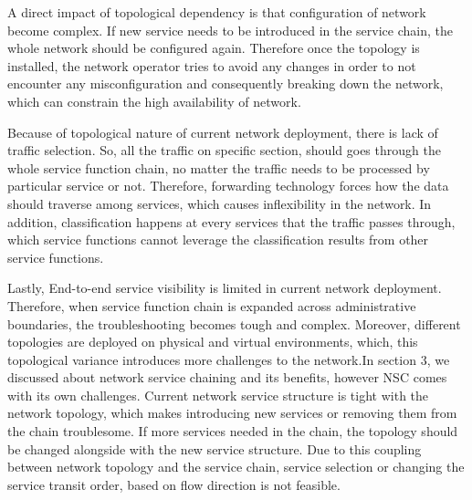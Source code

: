 A direct impact of topological dependency is that configuration of network become complex. If new service needs to be introduced in the service chain, the whole network should be configured again. Therefore once the topology is installed, the network operator tries to avoid any changes in order to not encounter any misconfiguration and consequently breaking down the network, which can constrain the high availability of network.

Because of topological nature of current network deployment, there is lack of traffic selection. So, all the traffic on specific section, should goes through the whole service function chain, no matter the traffic needs to be processed by particular service or not. Therefore, forwarding technology forces how the data should  traverse among services, which causes inflexibility in the network. In addition, classification happens at every services that the traffic passes through, which service functions cannot leverage the classification results from other service functions. 

Lastly, End-to-end service visibility is limited in current network deployment. Therefore, when service function chain is expanded across administrative boundaries, the troubleshooting becomes tough and complex. Moreover, different topologies are deployed on physical and virtual environments, which, this topological variance introduces more challenges to the network.In section 3, we discussed about network service chaining and its benefits, however NSC comes with its own challenges. Current network service structure is tight with the network topology, which makes introducing new services or removing them from the chain troublesome. If more services needed in the chain, the topology should be changed alongside with the new service structure. Due to this coupling between network topology and the service chain, service selection or changing the service transit order, based on flow direction is not feasible. \cite{QN14}

